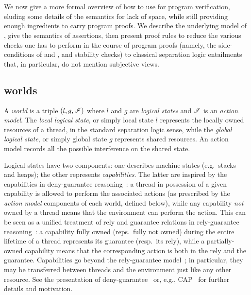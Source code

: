 \section{\colosl}
\label{sec:colosl}

We now give a more formal overview of how to use \colosl for program
verification, eluding some details of the semantics for lack of space,
while still providing enough ingredients to carry program proofs. We
describe the underlying model of \colosl, give the semantics of
\colosl assertions, then present proof rules to reduce the various
checks one has to perform in the course of \colosl program proofs
(namely, the side-conditions of \shiftRule and \extendRule, and
stability checks) to classical separation logic entailments that, in
particular, do not mention subjective views.


\subsection{\colosl worlds}
\label{sec:model}

A \emph{world} is a triple $(l, g, \mathscr{I})$ where $l$ and $g$ are
\emph{logical states} and $\mathscr{I}$ is an \emph{action model}. The
\emph{local logical state}, or simply local state $l$ represents the
locally owned resources of a thread, in the standard separation logic
sense, while the \emph{global logical state}, or simply global state
$g$ represents shared resources. An action model records all the
possible interference on the shared state.

Logical states have two components: one describes machine states
(e.g.\ stacks and heaps); the other represents
\emph{capabilities}. The latter are inspired by the capabilities in
deny-guarantee reasoning~\cite{dg}: a thread in possession of a given
capability is allowed to perform the associated actions (as prescribed
by the \emph{action model} components of each world, defined below),
while any capability \emph{not} owned by a thread means that the
environment can perform the action. This can be seen as a unified
treatment of rely and guarantee relations in rely-guarantee
reasoning~\cite{rg}: a capability fully owned (reps.\ fully not owned)
during the entire lifetime of a thread represents its guarantee
(resp.\ its rely), while a partially-owned capability means that the
corresponding action is both in the rely and the
guarantee. Capabilities go beyond the rely-guarantee model~\cite{dg};
in particular, they may be transferred between threads and the
environment just like any other resource. See the presentation of
deny-guarantee~\cite{dg} or, e.g., CAP~\cite{cap} for further details
and motivation.

